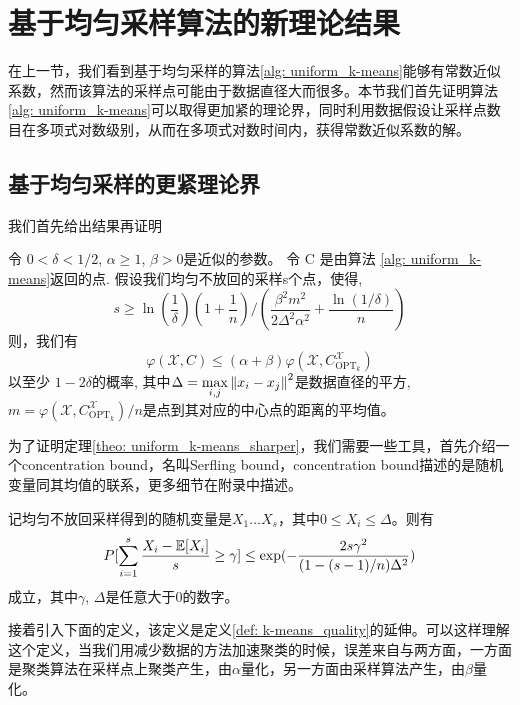 \section{基于均匀采样算法的新理论结果}
在上一节，我们看到基于均匀采样的算法\ref{alg: uniform_k-means}能够有常数近似系数，然而该算法的采样点可能由于数据直径大而很多。本节我们首先证明算法\ref{alg: uniform_k-means}可以取得更加紧的理论界，同时利用数据假设让采样点数目在多项式对数级别，从而在多项式对数时间内，获得常数近似系数的解。
\subsection{基于均匀采样的更紧理论界}
我们首先给出结果再证明
\begin{theorem}[均匀不放回采样的解的质量2]
    \label{theo: uniform_k-means_sharper}
    令 $0 < \delta <1/2$, $\alpha \geq 1$, $\beta >0$是近似的参数。 令 C 是由算法 \ref{alg: uniform_k-means}返回的点. 假设我们均匀不放回的采样s个点，使得,
    \begin{equation*}
    s \geq \ln(\frac{1}{\delta})(1+\frac{1}{n})/(\frac{\beta^2 m^2}{2\Delta^2 \alpha^2}+\frac{\ln(1/\delta)}{n})
    \end{equation*}
    则，我们有
    \begin{equation*}
    \varphi(\mathcal{X},C) \leq (\alpha + \beta)\varphi(\mathcal{X},C_{\text{OPT}_k}^{\mathcal{X}})
    \end{equation*}
    以至少 $1-2\delta$的概率, 其中$\Delta = \max\limits_{i,j}\left\lVert x_i - x_j\right\rVert^2$是数据直径的平方, $m = \varphi(\mathcal{X},C_{\text{OPT}_k}^{\mathcal{X}})/n$是点到其对应的中心点的距离的平均值。
\end{theorem}
为了证明定理\ref{theo: uniform_k-means_sharper}，我们需要一些工具，首先介绍一个concentration bound，名叫Serfling bound，concentration bound描述的是随机变量同其均值的联系，更多细节在附录中描述。
\begin{lemma}
    记均匀不放回采样得到的随机变量是$X_1 \ldots X_s$，其中$0 \leq X_i \leq \Delta$。则有
    \begin{equation*}
    P[\sum_{i=1}^s \frac{X_i - \mathbb{E}[X_i]}{s} \geq \gamma] \leq \exp(-\frac{2s\gamma^2}{(1-(s-1)/n)\Delta^2})
    \end{equation*}
    成立，其中$\gamma$, $\Delta$是任意大于0的数字。
\end{lemma}
接着引入下面的定义，该定义是定义\ref{def: k-means_quality}的延伸。可以这样理解这个定义，当我们用减少数据的方法加速聚类的时候，误差来自与两方面，一方面是聚类算法在采样点上聚类产生，由$\alpha$量化，另一方面由采样算法产生，由$\beta$量化。
